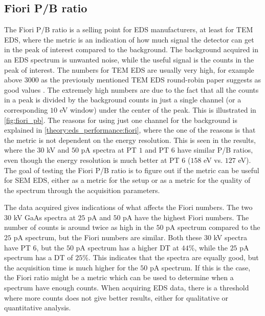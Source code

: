 \subsection{Fiori P/B ratio}
\label{discussion:fiori_peak_to_background_ratio}

The Fiori P/B ratio is a selling point for EDS manufacturers, at least for TEM EDS, where the metric is an indication of how much signal the detector can get in the peak of interest compared to the background.
The background acquired in an EDS spectrum is unwanted noise, while the useful signal is the counts in the peak of interest.
The numbers for TEM EDS are usually very high, for example above $3000$ as the previously mentioned TEM EDS round-robin paper suggests as good values \cite{bennett_egerton_1995,ted_pella_nio_tem_2019}.
The extremely high numbers are due to the fact that all the counts in a peak is divided by the background counts in just a single channel (or a corresponding $10$ eV window) under the center of the peak.
This is illustrated in \cref{fig:fiori_pb}.
The reasons for using just one channel for the background is explained in \cref{theory:eds_performance:fiori}, where the one of the reasons is that the metric is not dependent on the energy resolution.
This is seen in the results, where the $30$ kV and $50$ pA spectra at PT $1$ and PT $6$ have similar P/B ratios, even though the energy resolution is much better at PT $6$ ($158$ eV vs. $127$ eV).
The goal of testing the Fiori P/B ratio is to figure out if the metric can be useful for SEM EDS, either as a metric for the setup or as a metric for the quality of the spectrum through the acquisition parameters.


The data acquired gives indications of what affects the Fiori numbers.
The two $30$ kV GaAs spectra at $25$ pA and $50$ pA have the highest Fiori numbers.
The number of counts is around twice as high in the $50$ pA spectrum compared to the $25$ pA spectrum, but the Fiori numbers are similar.
Both these $30$ kV spectra have PT $6$, but the $50$ pA spectrum has a higher DT at $44$\%, while the $25$ pA spectrum has a DT of $25$\%.
This indicates that the spectra are equally good, but the acquisition time is much higher for the $50$ pA spectrum.
If this is the case, the Fiori ratio might be a metric which can be used to determine when a spectrum have enough counts.
When acquiring EDS data, there is a threshold where more counts does not give better results, either for qualitative or quantitative analysis.


